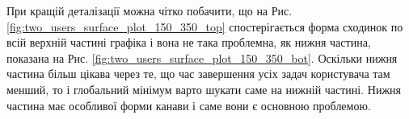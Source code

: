При кращій деталізації можна чітко побачити, що на Рис. \ref{fig:two_users_surface_plot_150_350_top} спостерігається форма сходинок по всій верхній частині графіка і вона не така проблемна, як нижня частина, показана на Рис. \ref{fig:two_users_surface_plot_150_350_bot}. Оскільки нижня частина більш цікава через те, що час завершення усіх задач користувача там менший, то і глобальний мінімум варто шукати саме на нижній частині. Нижня частина має особливої форми канави і саме вони є основною проблемою.





